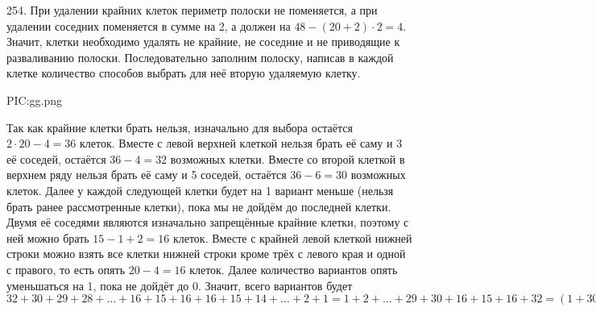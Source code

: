 254. При удалении крайних клеток периметр полоски не поменяется, а при удалении соседних поменяется в сумме на 2, а должен на $48-(20+2)\cdot2=4.$ Значит, клетки необходимо удалять не крайние, не соседние и не приводящие к разваливанию полоски. Последовательно заполним полоску, написав в каждой клетке количество способов выбрать для неё вторую удаляемую клетку.
\begin{center}
{{PIC:gg.png}}
\end{center}
Так как крайние клетки брать нельзя, изначально для выбора остаётся $2\cdot20-4=36$ клеток. Вместе с левой верхней клеткой нельзя брать её саму и 3 её соседей, остаётся $36-4=32$ возможных клетки. Вместе со второй клеткой в верхнем ряду нельзя брать её саму и 5 соседей, остаётся $36-6=30$ возможных клеток. Далее у каждой следующей клетки будет на 1 вариант меньше (нельзя брать ранее рассмотренные клетки), пока мы не дойдём до последней клетки. Двумя её соседями являются изначально запрещённые крайние клетки, поэтому с ней можно брать $15-1+2=16$ клеток. Вместе с крайней левой клеткой нижней строки можно взять все клетки нижней строки кроме трёх с левого края и одной с правого, то есть опять $20-4=16$ клеток. Далее количество вариантов опять уменьшаться на 1, пока не дойдёт до 0. Значит, всего вариантов будет $32+30+29+28+\ldots+16+15+16+16+15+14+\ldots+2+1=1+2+\ldots+29+30+16+15+16+32=(1+30)+(2+29)+\ldots+(15+16)+79=31\cdot15+79=544.$\newpage\noindent
